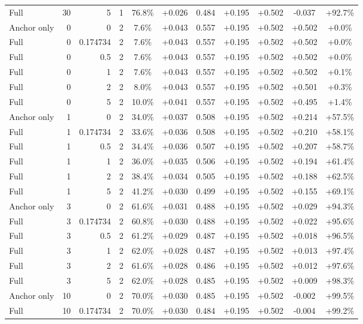 \begin{table}[htbp]
\begin{tabular}{lrrrccccccc}
Full & 30 & 5 & 1 & 76.8\% & +0.026 & 0.484 & +0.195 & +0.502 & -0.037 & +92.7\% \\
Anchor only & 0 & 0 & 2 & 7.6\% & +0.043 & 0.557 & +0.195 & +0.502 & +0.502 & +0.0\% \\
Full & 0 & 0.174734 & 2 & 7.6\% & +0.043 & 0.557 & +0.195 & +0.502 & +0.502 & +0.0\% \\
Full & 0 & 0.5 & 2 & 7.6\% & +0.043 & 0.557 & +0.195 & +0.502 & +0.502 & +0.0\% \\
Full & 0 & 1 & 2 & 7.6\% & +0.043 & 0.557 & +0.195 & +0.502 & +0.502 & +0.1\% \\
Full & 0 & 2 & 2 & 8.0\% & +0.043 & 0.557 & +0.195 & +0.502 & +0.501 & +0.3\% \\
Full & 0 & 5 & 2 & 10.0\% & +0.041 & 0.557 & +0.195 & +0.502 & +0.495 & +1.4\% \\
Anchor only & 1 & 0 & 2 & 34.0\% & +0.037 & 0.508 & +0.195 & +0.502 & +0.214 & +57.5\% \\
Full & 1 & 0.174734 & 2 & 33.6\% & +0.036 & 0.508 & +0.195 & +0.502 & +0.210 & +58.1\% \\
Full & 1 & 0.5 & 2 & 34.4\% & +0.036 & 0.507 & +0.195 & +0.502 & +0.207 & +58.7\% \\
Full & 1 & 1 & 2 & 36.0\% & +0.035 & 0.506 & +0.195 & +0.502 & +0.194 & +61.4\% \\
Full & 1 & 2 & 2 & 38.4\% & +0.034 & 0.505 & +0.195 & +0.502 & +0.188 & +62.5\% \\
Full & 1 & 5 & 2 & 41.2\% & +0.030 & 0.499 & +0.195 & +0.502 & +0.155 & +69.1\% \\
Anchor only & 3 & 0 & 2 & 61.6\% & +0.031 & 0.488 & +0.195 & +0.502 & +0.029 & +94.3\% \\
Full & 3 & 0.174734 & 2 & 60.8\% & +0.030 & 0.488 & +0.195 & +0.502 & +0.022 & +95.6\% \\
Full & 3 & 0.5 & 2 & 61.2\% & +0.029 & 0.487 & +0.195 & +0.502 & +0.018 & +96.5\% \\
Full & 3 & 1 & 2 & 62.0\% & +0.028 & 0.487 & +0.195 & +0.502 & +0.013 & +97.4\% \\
Full & 3 & 2 & 2 & 61.6\% & +0.028 & 0.486 & +0.195 & +0.502 & +0.012 & +97.6\% \\
Full & 3 & 5 & 2 & 62.0\% & +0.028 & 0.485 & +0.195 & +0.502 & +0.009 & +98.3\% \\
Anchor only & 10 & 0 & 2 & 70.0\% & +0.030 & 0.485 & +0.195 & +0.502 & -0.002 & +99.5\% \\
Full & 10 & 0.174734 & 2 & 70.0\% & +0.030 & 0.484 & +0.195 & +0.502 & -0.004 & +99.2\% \\

\end{tabular}
\end{table}
